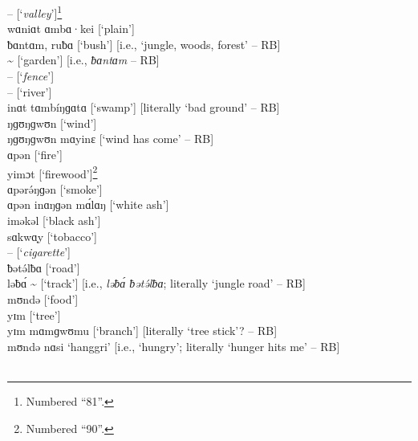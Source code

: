 \noindent --         [‘\textit{valley}’]\footnote{Numbered “81”.}\\
wɑniɑt ɑmbɑ·kei  [‘plain’]\\
ƀɑntɑm, ruƀɑ    [‘bush’] [i.e., ‘jungle, woods, forest’ -- RB]\\
{\textasciitilde}        [‘garden’] [i.e., \textit{ƀɑntɑm} -- RB]\\
 --         [‘\textit{fence}’]\\
 --         [‘river’]\\
inɑt tɑmbíŋɡɑtɑ  [‘swamp’] [literally ‘bad ground’ -- RB]\\
ŋɡʊŋɡwʊn    [‘wind’]\\
ŋɡʊŋɡwʊn mɑyinɛ  [‘wind has come’ -- RB]\\
ɑpən      [‘fire’]\\
yimɔt      [‘firewood’]\footnote{Numbered “90”.}\\
ɑpərə́ŋɡən   [‘smoke’]\\
ɑpən inɑŋɡən mɑ́lɑŋ   [‘white ash’]\\
iməkəl     [‘black ash’]\\
sɑkwɑ͔y     [‘tobacco’]\\
 --        [‘\textit{cigarette}’]\\
ƀətə́lƀɑ     [‘road’]\\
ləƀɑ́ {\textasciitilde}      [‘track’] [i.e., \textit{ləƀɑ́ ƀətə́lƀɑ}; literally ‘jungle road’ -- RB]\\
mʊndə     [‘food’]\\
yɪm       [‘tree’]\\
yɪm mɑmɡwʊmu   [‘branch’] [literally ‘tree stick’? -- RB]\\
mʊndə nɑsi  ‘hanggri’ [i.e., ‘hungry’; literally ‘hunger hits me’ -- RB]\\

\\

